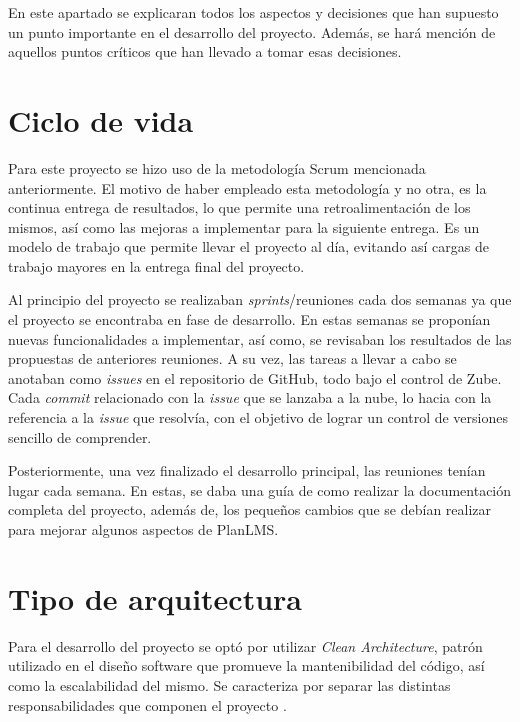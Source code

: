 
En este apartado se explicaran todos los aspectos y decisiones que han supuesto un punto importante en el desarrollo del proyecto. Además, se hará mención de aquellos puntos críticos que han llevado a tomar esas decisiones.


\section{Ciclo de vida}
Para este proyecto se hizo uso de la metodología Scrum mencionada anteriormente. El motivo de haber empleado esta metodología y no otra, es la continua entrega de resultados, lo que permite una retroalimentación de los mismos, así como las mejoras a implementar para la siguiente entrega. Es un modelo de trabajo que permite llevar el proyecto al día, evitando así cargas de trabajo mayores en la entrega final del proyecto.

Al principio del proyecto se realizaban \textit{sprints}/reuniones cada dos semanas ya que el proyecto se encontraba en fase de desarrollo. En estas semanas se proponían nuevas funcionalidades a implementar, así como, se revisaban los resultados de las propuestas de anteriores reuniones. A su vez, las tareas a llevar a cabo se anotaban como \textit{issues} en el repositorio de GitHub, todo bajo el control de Zube. Cada \textit{commit} relacionado con la \textit{issue} que se lanzaba a la nube, lo hacia con la referencia a la \textit{issue} que resolvía, con el objetivo de lograr un control de versiones sencillo de comprender.

Posteriormente, una vez finalizado el desarrollo principal, las reuniones tenían lugar cada semana. En estas, se daba una guía de como realizar la documentación completa del proyecto, además de, los pequeños cambios que se debían realizar para mejorar algunos aspectos de PlanLMS.

\section{Tipo de arquitectura}
Para el desarrollo del proyecto se optó por utilizar \textit{Clean Architecture}, patrón utilizado en el diseño software que promueve la mantenibilidad del código, así como la escalabilidad del mismo. Se caracteriza por separar las distintas responsabilidades que componen el proyecto \cite{arquitectura_domain}.

